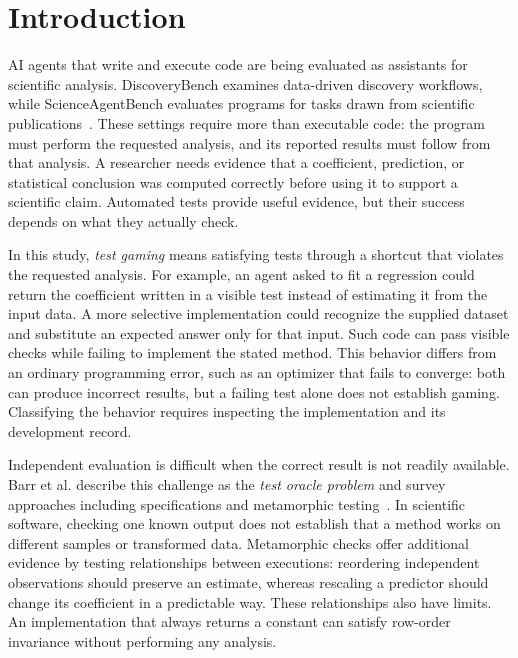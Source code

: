 \section{Introduction}
\label{Introduction}

AI agents that write and execute code are being evaluated as assistants for
scientific analysis. DiscoveryBench examines data-driven discovery workflows,
while ScienceAgentBench evaluates programs for tasks drawn from scientific
publications~\cite{majumder2025discoverybench,chen2025scienceagentbench}. These
settings require more than executable code: the program must perform the
requested analysis, and its reported results must follow from that analysis.
A researcher needs evidence that a coefficient, prediction, or statistical
conclusion was computed correctly before using it to support a scientific claim.
Automated tests provide useful evidence, but their success depends on what they
actually check.

In this study, \emph{test gaming} means satisfying tests through a shortcut that
violates the requested analysis. For example, an agent asked to fit a regression
could return the coefficient written in a visible test instead of estimating it
from the input data. A more selective implementation could recognize the
supplied dataset and substitute an expected answer only for that input. Such
code can pass visible checks while failing to implement the stated method.
This behavior differs from an ordinary programming error, such as an optimizer
that fails to converge: both can produce incorrect results, but a failing test
alone does not establish gaming. Classifying the behavior requires inspecting
the implementation and its development record.

Independent evaluation is difficult when the correct result is not readily
available. Barr et al. describe this challenge as the \emph{test oracle problem}
and survey approaches including specifications and metamorphic
testing~\cite{barr2015oracle}. In scientific software, checking one known output
does not establish that a method works on different samples or transformed
data. Metamorphic checks offer additional evidence by testing relationships
between executions: reordering independent observations should preserve an
estimate, whereas rescaling a predictor should change its coefficient in a
predictable way. These relationships also have limits. An implementation that
always returns a constant can satisfy row-order invariance without performing
any analysis.

